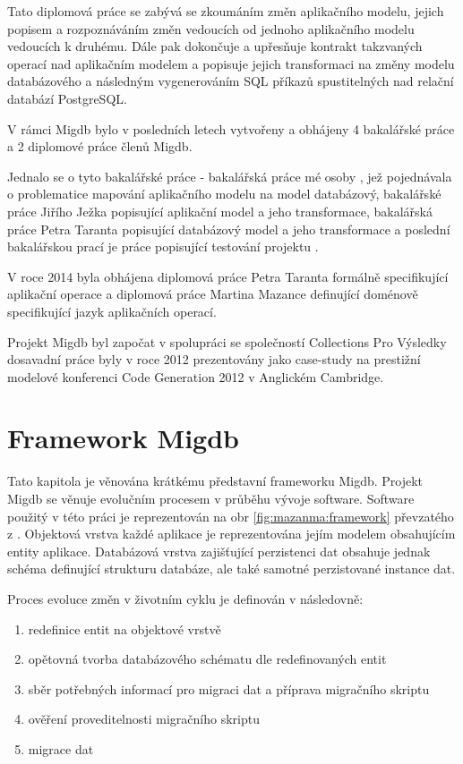 \documentclass[11pt,twoside,a4paper]{book}
\begin{document}
Tato diplomová práce se zabývá se zkoumáním změn aplikačního modelu, jejich
popisem a rozpoznáváním změn vedoucích od jednoho aplikačního modelu vedoucích
k druhému. Dále pak dokončuje a upřesňuje kontrakt takzvaných operací nad
aplikačním modelem a popisuje jejich transformaci na změny modelu databázového
a následným vygenerováním SQL příkazů spustitelných nad relační databází PostgreSQL.

V rámci Migdb bylo v posledních letech vytvořeny a obhájeny 4 bakalářské práce a
2 diplomové práce členů Migdb.

Jednalo se o tyto bakalářské práce - bakalářská práce mé osoby \cite{Lukes},
jež pojednávala o problematice mapování aplikačního modelu na model databázový,
bakalářské práce Jiřího Ježka \cite{Jezek} popisující aplikační model a jeho
transformace, bakalářská práce Petra Taranta \cite{Tarant_bp} popisující
databázový model a jeho transformace a poslední bakalářskou prací je práce
popisující testování projektu \cite{Luksch}.

V roce 2014 byla obhájena diplomová práce Petra Taranta \cite{Tarant_dip}
formálně specifikující aplikační operace a diplomová práce Martina Mazance
\cite{Mazanec} definující doménově specifikující jazyk aplikačních operací.

Projekt Migdb byl započat v spolupráci se společností Collections Pro Výsledky
dosavadní práce byly v roce 2012 prezentovány jako case-study na prestižní
modelové konferenci Code Generation 2012 \cite{Cambridge} v Anglickém Cambridge.

\section{Framework Migdb}
	
Tato kapitola je věnována krátkému představní frameworku Migdb. Projekt Migdb se
věnuje evolučním procesem v průběhu vývoje software. Software použitý v této
práci je reprezentován na obr \ref{fig:mazanma:framework} převzatého z
\cite{Mazanec}.
Objektová vrstva každé aplikace je reprezentována jejím modelem obsahujícím entity aplikace. Databázová
vrstva zajišťující perzistenci dat obsahuje jednak schéma definující strukturu
databáze, ale také samotné perzistované instance dat.

Proces evoluce změn v životním cyklu je definován v \cite{Jezek}
následovně:


\begin{enumerate}\label{framework:jezek_def}
  \item redefinice entit na objektové vrstvě
  \item opětovná tvorba databázového schématu dle redefinovaných entit
  \item sběr potřebných informací pro migraci dat a příprava migračního skriptu
  \item ověření proveditelnosti migračního skriptu
  \item migrace dat
\end{enumerate}
\end{document}
